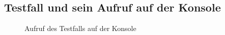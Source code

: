 \subsection{Testfall und sein Aufruf auf der Konsole}
\label{app:Test}

\clearpage
\begin{figure}[htb]
\centering
{}
\caption{Aufruf des Testfalls auf der Konsole}
\end{figure}
